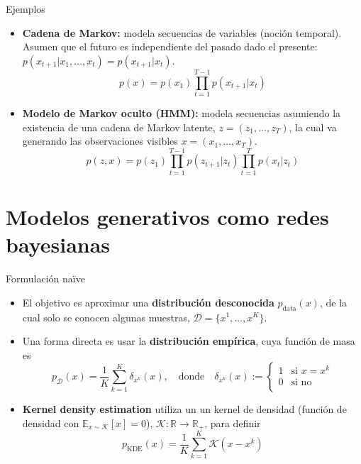 \documentclass{beamer}
\newcommand{\R}{\mathbb{R}}
\begin{document}
\begin{frame}{Ejemplos}
    \begin{itemize}
        \item \textbf{Cadena de Markov:} modela secuencias de variables (noción temporal). Asumen que el futuro es independiente del pasado dado el presente: $p(x_{t+1}|x_1,\ldots,x_t)=p(x_{t+1}|x_t)$.
              \begin{equation*}
                  p(x)=p(x_1)\prod_{t=1}^{T-1} p(x_{t+1}|x_t)
              \end{equation*}
        \item \textbf{Modelo de Markov oculto (HMM):} modela secuencias asumiendo la existencia de una cadena de Markov latente, $z=(z_1,\ldots,z_T)$, la cual va generando las observaciones visibles $x=(x_1,\ldots,x_T)$.
              \begin{equation*}
                  p(z,x)=p(z_1)\prod_{t=1}^{T-1} p(z_{t+1}|z_t)\prod_{t=1}^T p(x_t|z_t)
              \end{equation*}
    \end{itemize}
\end{frame}

\section{Modelos generativos como redes bayesianas}

\begin{frame}{Formulación naïve}
    \begin{itemize}
        \item El objetivo es aproximar una \textbf{distribución desconocida} $p_{\text{data}}(x)$, de la cual solo se conocen algunas muestras, $\mathcal{D}=\{x^1,\ldots,x^K\}$.
        \item Una forma directa es usar la \textbf{distribución empírica}, cuya función de masa es
              \begin{equation*}
                  p_{\mathcal{D}}(x)=\frac{1}{K}\sum_{k=1}^K \delta_{x^k}(x),
                  \quad\text{donde}\quad
                  \delta_{x^k}(x):=
                  \begin{cases}
                      1 & \text{si }x=x^k \\
                      0 & \text{si no}    \\
                  \end{cases}
              \end{equation*}
        \item \textbf{Kernel density estimation} utiliza un un kernel de densidad (función de densidad con $\mathbb{E}_{x\sim \mathcal{K}}\left[x\right]=0$), $\mathcal{K}:\R\to\R_+$, para definir
              \begin{equation*}
                  p_{\text{KDE}}(x)=\frac{1}{K}\sum_{k=1}^K \mathcal{K}(x-x^k)
              \end{equation*}
    \end{itemize}
\end{frame}
\end{document}
